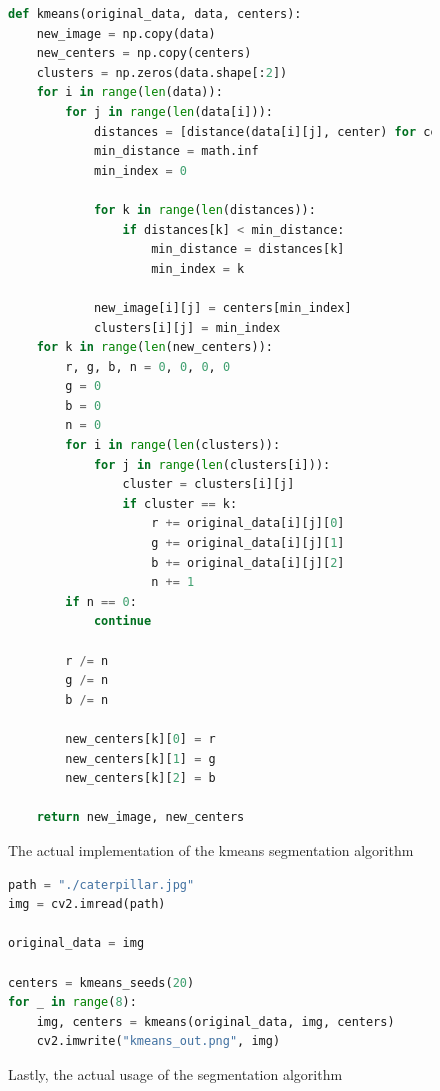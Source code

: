\documentclass[a4paper, titlepage,12pt]{article}
\begin{document}
\begin{figure}[H]
	\begin{center}
		\begin{lstlisting}[language=Python]
def kmeans(original_data, data, centers):
    new_image = np.copy(data)
    new_centers = np.copy(centers)
    clusters = np.zeros(data.shape[:2])
    for i in range(len(data)):
        for j in range(len(data[i])):
            distances = [distance(data[i][j], center) for center in centers]
            min_distance = math.inf
            min_index = 0

            for k in range(len(distances)):
                if distances[k] < min_distance:
                    min_distance = distances[k]
                    min_index = k

            new_image[i][j] = centers[min_index]
            clusters[i][j] = min_index
    for k in range(len(new_centers)):
        r, g, b, n = 0, 0, 0, 0
        g = 0
        b = 0
        n = 0
        for i in range(len(clusters)):
            for j in range(len(clusters[i])):
                cluster = clusters[i][j]
                if cluster == k:
                    r += original_data[i][j][0]
                    g += original_data[i][j][1]
                    b += original_data[i][j][2]
                    n += 1
        if n == 0:
            continue

        r /= n
        g /= n
        b /= n

        new_centers[k][0] = r
        new_centers[k][1] = g
        new_centers[k][2] = b

    return new_image, new_centers
		\end{lstlisting}
		\caption{The actual implementation of the kmeans segmentation algorithm}
	\end{center}
\end{figure}

\begin{figure}[H]
	\begin{center}
		\begin{lstlisting}[language=Python]
path = "./caterpillar.jpg"
img = cv2.imread(path)

original_data = img

centers = kmeans_seeds(20)
for _ in range(8):
	img, centers = kmeans(original_data, img, centers)
	cv2.imwrite("kmeans_out.png", img)
		\end{lstlisting}
		\caption{Lastly, the actual usage of the segmentation algorithm}
	\end{center}
\end{figure}
\end{document}
